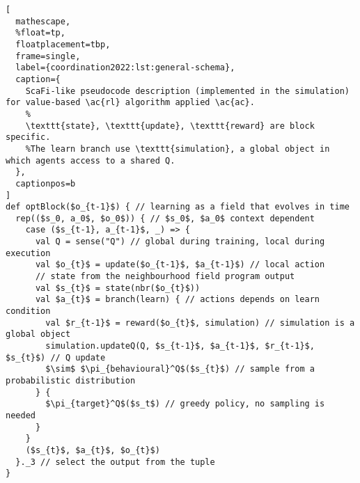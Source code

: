 
\begin{lstlisting}[
  mathescape,
  %float=tp,
  floatplacement=tbp,
  frame=single,
  label={coordination2022:lst:general-schema},
  caption={
    ScaFi-like pseudocode description (implemented in the simulation) for value-based \ac{rl} algorithm applied \ac{ac}.
    %
    \texttt{state}, \texttt{update}, \texttt{reward} are block specific. 
    %The learn branch use \texttt{simulation}, a global object in which agents access to a shared Q.
  },
  captionpos=b
]
def optBlock($o_{t-1}$) { // learning as a field that evolves in time
  rep(($s_0, a_0$, $o_0$)) { // $s_0$, $a_0$ context dependent 
    case ($s_{t-1}, a_{t-1}$, _) => {
      val Q = sense("Q") // global during training, local during execution
      val $o_{t}$ = update($o_{t-1}$, $a_{t-1}$) // local action
      // state from the neighbourhood field program output
      val $s_{t}$ = state(nbr($o_{t}$))
      val $a_{t}$ = branch(learn) { // actions depends on learn condition
        val $r_{t-1}$ = reward($o_{t}$, simulation) // simulation is a global object
        simulation.updateQ(Q, $s_{t-1}$, $a_{t-1}$, $r_{t-1}$, $s_{t}$) // Q update
        $\sim$ $\pi_{behavioural}^Q$($s_{t}$) // sample from a probabilistic distribution
      } {
        $\pi_{target}^Q$($s_t$) // greedy policy, no sampling is needed
      }
    }
    ($s_{t}$, $a_{t}$, $o_{t}$) 
  }._3 // select the output from the tuple
}
  \end{lstlisting}
